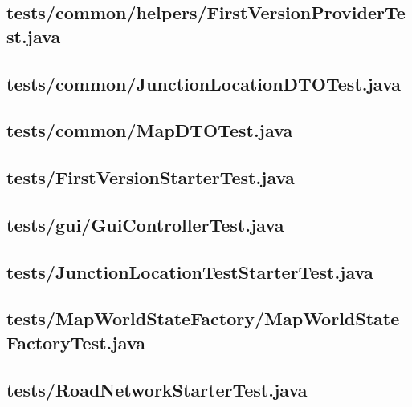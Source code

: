 
\newpage
\subsection{tests/common/helpers/FirstVersionProviderTest.java}

\newpage
\subsection{tests/common/JunctionLocationDTOTest.java}

\newpage
\subsection{tests/common/MapDTOTest.java}

\newpage
\subsection{tests/FirstVersionStarterTest.java}

\newpage
\subsection{tests/gui/GuiControllerTest.java}

\newpage
\subsection{tests/JunctionLocationTestStarterTest.java}

\newpage
\subsection{tests/MapWorldStateFactory/MapWorldStateFactoryTest.java}

\newpage
\subsection{tests/RoadNetworkStarterTest.java}

\newpage
